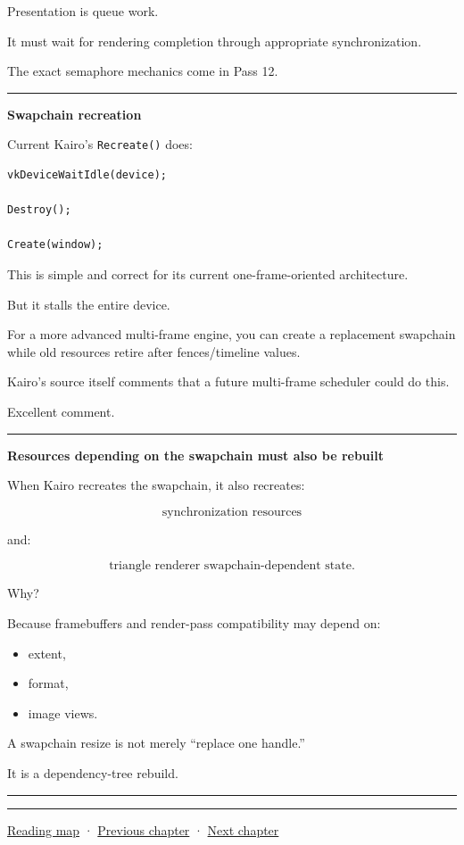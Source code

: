 Presentation is queue work.

It must wait for rendering completion through appropriate synchronization.

The exact semaphore mechanics come in Pass 12.

\begin{center}\rule{0.5\linewidth}{0.5pt}\end{center}

\textbf{Swapchain recreation}

Current Kairo's \texttt{Recreate()} does:

\begin{verbatim}
vkDeviceWaitIdle(device);

Destroy();

Create(window);
\end{verbatim}

This is simple and correct for its current one-frame-oriented architecture.

But it stalls the entire device.

For a more advanced multi-frame engine, you can create a replacement swapchain while old resources retire after fences/timeline values.

Kairo's source itself comments that a future multi-frame scheduler could do this.

Excellent comment.

\begin{center}\rule{0.5\linewidth}{0.5pt}\end{center}

\textbf{Resources depending on the swapchain must also be rebuilt}

When Kairo recreates the swapchain, it also recreates:

\[
\text{synchronization resources}
\]

and:

\[
\text{triangle renderer swapchain-dependent state}.
\]

Why?

Because framebuffers and render-pass compatibility may depend on:

\begin{itemize}
\tightlist
\item
  extent,
\item
  format,
\item
  image views.
\end{itemize}

A swapchain resize is not merely ``replace one handle.''

It is a dependency-tree rebuild.

\begin{center}\rule{0.5\linewidth}{0.5pt}\end{center}

\begin{center}\rule{0.5\linewidth}{0.5pt}\end{center}

\href{Chapter\%20Edition/03\%20-\%20Game\%20Engine/00\%20-\%20Reading\%20Map}{Reading map} · \hyperref[05-engine-i-ch019]{Previous chapter} · \hyperref[05-engine-i-ch021]{Next chapter}
